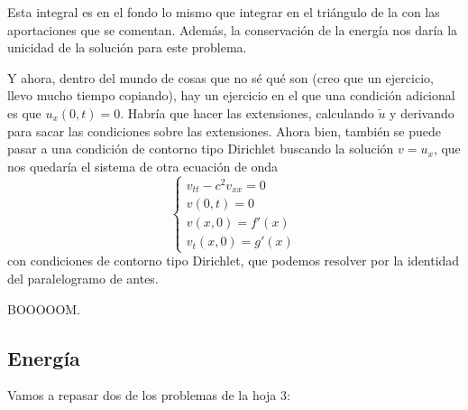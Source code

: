 		Esta integral es en el fondo lo mismo que integrar en el triángulo de la  con las aportaciones que se comentan. Además, la conservación de la energía nos daría la unicidad de la solución para este problema.

		Y ahora, dentro del mundo de cosas que no sé qué son (creo que un ejercicio, llevo mucho tiempo copiando), hay un ejercicio en el que una condición adicional es que $u_x(0,t) = 0$. Habría que hacer las extensiones, calculando $\tilde{u}$ y derivando para sacar las condiciones sobre las extensiones. Ahora bien, también se puede pasar a una condición de contorno tipo Dirichlet buscando la solución $v = u_x$, que nos quedaría el sistema de otra ecuación de onda \[ \begin{cases} v_{tt} - c^2v_{xx} = 0 \\ v(0,t) = 0 \\ v(x,0) = f'(x) \\ v_t(x,0) = g'(x) \end{cases}\] con condiciones de contorno tipo Dirichlet, que podemos resolver por la identidad del paralelogramo de antes.

		BOOOOOM.

		\subsection{Energía}

			Vamos a repasar dos de los problemas de la hoja 3:

